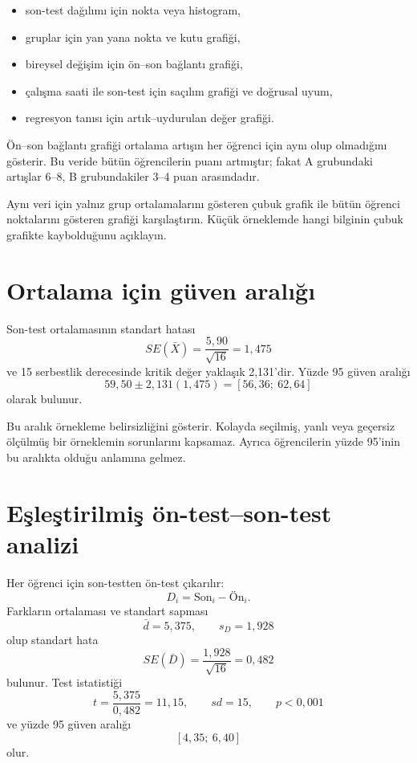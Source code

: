 \begin{itemize}
  \item son-test dağılımı için nokta veya histogram,
  \item gruplar için yan yana nokta ve kutu grafiği,
  \item bireysel değişim için ön--son bağlantı grafiği,
  \item çalışma saati ile son-test için saçılım grafiği ve doğrusal uyum,
  \item regresyon tanısı için artık--uydurulan değer grafiği.
\end{itemize}

Ön--son bağlantı grafiği ortalama artışın her öğrenci için aynı olup olmadığını
gösterir. Bu veride bütün öğrencilerin puanı artmıştır; fakat A grubundaki
artışlar 6--8, B grubundakiler 3--4 puan arasındadır.

\begin{etkinlik}
Aynı veri için yalnız grup ortalamalarını gösteren çubuk grafik ile bütün
öğrenci noktalarını gösteren grafiği karşılaştırın. Küçük örneklemde hangi
bilginin çubuk grafikte kaybolduğunu açıklayın.
\end{etkinlik}

\section{Ortalama için güven aralığı}

Son-test ortalamasının standart hatası
\[
SE(\bar X)=\frac{5{,}90}{\sqrt{16}}=1{,}475
\]
ve 15 serbestlik derecesinde kritik değer yaklaşık 2,131'dir. Yüzde 95 güven
aralığı
\[
59{,}50\pm2{,}131(1{,}475)
=[56{,}36;\ 62{,}64]
\]
olarak bulunur.

Bu aralık örnekleme belirsizliğini gösterir. Kolayda seçilmiş, yanlı veya
geçersiz ölçülmüş bir örneklemin sorunlarını kapsamaz. Ayrıca öğrencilerin
yüzde 95'inin bu aralıkta olduğu anlamına gelmez.

\section{Eşleştirilmiş ön-test--son-test analizi}

Her öğrenci için son-testten ön-test çıkarılır:
\[
D_i=\text{Son}_i-\text{Ön}_i.
\]
Farkların ortalaması ve standart sapması
\[
\bar d=5{,}375,
\qquad s_D=1{,}928
\]
olup standart hata
\[
SE(\bar D)=\frac{1{,}928}{\sqrt{16}}=0{,}482
\]
bulunur. Test istatistiği
\[
t=\frac{5{,}375}{0{,}482}=11{,}15,
\qquad sd=15,
\qquad p<0{,}001
\]
ve yüzde 95 güven aralığı
\[
[4{,}35;\ 6{,}40]
\]
olur.

